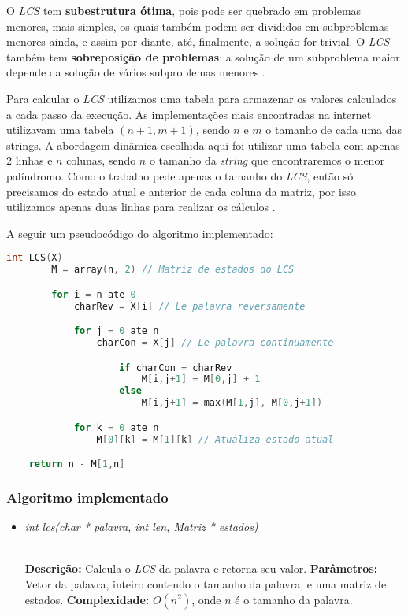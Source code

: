 \documentclass[12pt]{article}
\begin{document}
    O \textit{LCS} tem \textbf{subestrutura ótima}, pois pode ser quebrado em problemas menores, mais simples, os quais também podem ser divididos em subproblemas menores ainda, e assim por diante, até, finalmente, a solução for trivial. O \textit{LCS} também tem \textbf{sobreposição de problemas}: a solução de um subproblema maior depende da solução de vários subproblemas menores \cite{wikilcs}.

    Para calcular o \textit{LCS} utilizamos uma tabela para armazenar os valores calculados a cada passo da execução. As implementações mais encontradas na internet utilizavam uma tabela $(n+1, m+1)$, sendo $n$ e $m$ o tamanho de cada uma das strings. A abordagem dinâmica escolhida aqui foi utilizar uma tabela com apenas $2$ linhas e $n$ colunas, sendo $n$ o tamanho da \textit{string} que encontraremos o menor palíndromo. Como o trabalho pede apenas o tamanho do \textit{LCS}, então só precisamos do estado atual e anterior de cada coluna da matriz, por isso utilizamos apenas duas linhas para realizar os cálculos \cite{hirsch}.

    A seguir um pseudocódigo do algoritmo implementado:

    \newpage

    \begin{lstlisting}[language=c]
    int LCS(X)
        M = array(n, 2) // Matriz de estados do LCS

        for i = n ate 0
            charRev = X[i] // Le palavra reversamente

            for j = 0 ate n
                charCon = X[j] // Le palavra continuamente

                    if charCon = charRev
                        M[i,j+1] = M[0,j] + 1
                    else
                        M[i,j+1] = max(M[1,j], M[0,j+1])

            for k = 0 ate n
                M[0][k] = M[1][k] // Atualiza estado atual

    return n - M[1,n]
    \end{lstlisting}


\subsubsection{Algoritmo implementado}

\begin{itemize}
 \item \begin{large}\textit{int lcs(char * palavra, int len, Matriz * estados)}\end{large}\\
 \subitem \textbf{Descrição:} Calcula o \textit{LCS} da palavra e retorna seu valor.
 \subitem \textbf{Parâmetros:} Vetor da palavra, inteiro contendo o tamanho da palavra, e uma matriz de estados.
 \subitem \textbf{Complexidade:} $O(n^2)$, onde $n$ é o tamanho da palavra.
\end{itemize}
\end{document}
